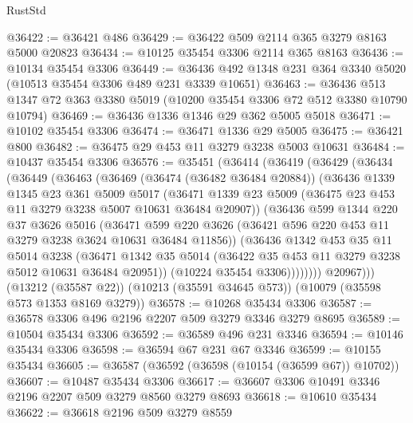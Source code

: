 \begin{lexlean}{RustStd}
\begin{coremodule}
@36422 := @36421 @486
@36429 := @36422 @509 @2114 @365 @3279 @8163 @5000 @20823
@36434 := @10125 @35454 @3306 @2114 @365 @8163
@36436 := @10134 @35454 @3306
@36449 := @36436 @492 @1348 @231 @364 @3340 @5020 (@10513 @35454 @3306 @489 @231 @3339 @10651)
@36463 := @36436 @513 @1347 @72 @363 @3380 @5019 (@10200 @35454 @3306 @72 @512 @3380 @10790 @10794)
@36469 := @36436 @1336 @1346 @29 @362 @5005 @5018
@36471 := @10102 @35454 @3306
@36474 := @36471 @1336 @29 @5005
@36475 := @36421 @800
@36482 := @36475 @29 @453 @11 @3279 @3238 @5003 @10631
@36484 := @10437 @35454 @3306
@36576 := @35451
    (@36414
      (@36419
        (@36429
          (@36434
            (@36449
              (@36463
                (@36469
                  (@36474 (@36482 @36484 @20884))
                  (@36436
                    @1339
                    @1345
                    @23
                    @361
                    @5009
                    @5017
                    (@36471
                      @1339
                      @23
                      @5009
                      (@36475 @23 @453 @11 @3279 @3238 @5007 @10631 @36484 @20907))
                    (@36436
                      @599
                      @1344
                      @220
                      @37
                      @3626
                      @5016
                      (@36471
                        @599
                        @220
                        @3626
                        (@36421 @596 @220 @453 @11 @3279 @3238 @3624 @10631 @36484 @11856))
                      (@36436
                        @1342
                        @453
                        @35
                        @11
                        @5014
                        @3238
                        (@36471
                          @1342
                          @35
                          @5014
                          (@36422 @35 @453 @11 @3279 @3238 @5012 @10631 @36484 @20951))
                        (@10224 @35454 @3306))))))))
          @20967)))
    (@13212 (@35587 @22))
    (@10213 (@35591 @34645 @573))
    (@10079 (@35598 @573 @1353 @8169 @3279))
@36578 := @10268 @35434 @3306
@36587 := @36578 @3306 @496 @2196 @2207 @509 @3279 @3346 @3279 @8695
@36589 := @10504 @35434 @3306
@36592 := @36589 @496 @231 @3346
@36594 := @10146 @35434 @3306
@36598 := @36594 @67 @231 @67 @3346
@36599 := @10155 @35434
@36605 := @36587 (@36592 (@36598 (@10154 (@36599 @67)) @10702))
@36607 := @10487 @35434 @3306
@36617 := @36607 @3306 @10491 @3346 @2196 @2207 @509 @3279 @8560 @3279 @8693
@36618 := @10610 @35434
@36622 := @36618 @2196 @509 @3279 @8559

\end{coremodule}
\end{lexlean}
